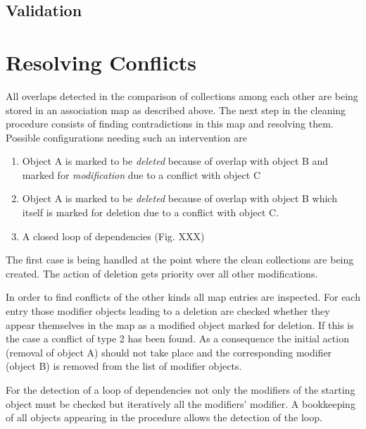 \documentclass{cmspaper}
\begin{document}
\subsection{Validation}


\section{Resolving Conflicts}
\label{mapReso}
All overlaps detected in the comparison of collections among each other are
being stored in an association map as described above. The next step in the cleaning procedure
consists of finding contradictions in this map and resolving them.
Possible configurations needing such an intervention are
\begin{enumerate}
    \item Object A is marked to be \textit{deleted} because of overlap with
	object B and marked for \textit{modification} due to a conflict with
	object C
    \item Object A is marked to be \textit{deleted} because of overlap with object B
	which itself is marked for deletion due to a conflict with object C.
    \item A closed loop of dependencies (Fig. XXX) %
\end{enumerate}


The first case is being handled at the point where the clean collections are
being created. The action of deletion gets priority over all other
modifications.

In order to find conflicts of the other kinds all map entries are inspected. For
each entry those modifier objects leading to a deletion are checked whether they
appear themselves in the map as a modified object marked for deletion. If this
is the case a conflict of type 2 has been found. As a consequence the initial
action (removal of object A)  should not take place and the corresponding
modifier (object B) is removed from the list of modifier objects.

For the detection of a loop of dependencies not only the modifiers of the
starting object must be checked but iteratively all the modifiers' modifier. A
bookkeeping of all objects appearing in the procedure allows the detection of
the loop.
\end{document}
